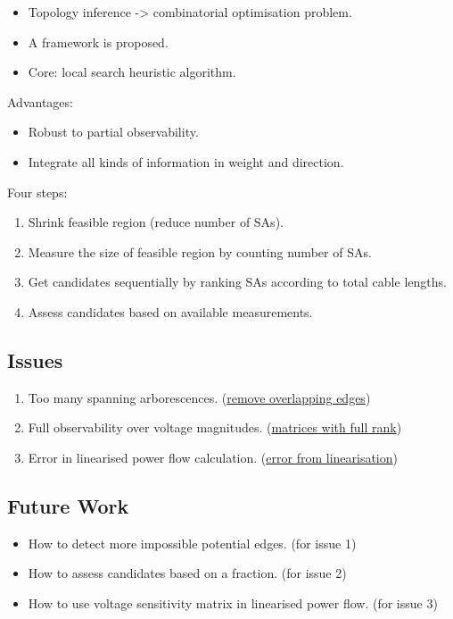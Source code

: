 \documentclass[
]{book}
\providecommand{\tightlist}{%
  \setlength{\itemsep}{0pt}\setlength{\parskip}{0pt}}
\begin{document}
\begin{itemize}
\tightlist
\item
  Topology inference -\textgreater{} combinatorial optimisation problem.
\item
  A framework is proposed.
\item
  Core: local search heuristic algorithm.
\end{itemize}

Advantages:

\begin{itemize}
\tightlist
\item
  Robust to partial observability.
\item
  Integrate all kinds of information in weight and direction.
\end{itemize}

Four steps:

\begin{enumerate}
\def\labelenumi{\arabic{enumi}.}
\tightlist
\item
  Shrink feasible region (reduce number of SAs).
\item
  Measure the size of feasible region by counting number of SAs.
\item
  Get candidates sequentially by ranking SAs according to total cable lengths.
\item
  Assess candidates based on available measurements.
\end{enumerate}

\hypertarget{issues}{%
\subsection*{Issues}\label{issues}}

\begin{enumerate}
\def\labelenumi{\arabic{enumi}.}
\tightlist
\item
  Too many spanning arborescences. (\protect\hyperlink{overlapping}{remove overlapping edges})
\item
  Full observability over voltage magnitudes. (\protect\hyperlink{BRM}{matrices with full
  rank})
\item
  Error in linearised power flow calculation. (\protect\hyperlink{error}{error from
  linearisation})
\end{enumerate}

\hypertarget{future-work}{%
\subsection*{Future Work}\label{future-work}}

\begin{itemize}
\tightlist
\item
  How to detect more impossible potential edges. (for issue 1)
\item
  How to assess candidates based on a fraction. (for issue 2)
\item
  How to use voltage sensitivity matrix in linearised power flow. (for issue 3)
\end{itemize}

  
\end{document}
